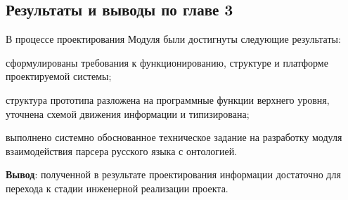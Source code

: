 \subsection{Результаты и выводы по главе 3}

В процессе проектирования Модуля были достигнуты следующие результаты:
\begin{list}{}{\leftmargin=1.5cm}
	\item сформулированы требования к функционированию, структуре и платформе проектируемой системы;
	\item структура прототипа разложена на программные функции верхнего уровня, уточнена схемой движения информации и типизирована;
	\item выполнено системно обоснованное техническое задание на разработку модуля взаимодействия парсера русского языка с онтологией.
\end{list}

\textbf{Вывод}: полученной в результате проектирования информации достаточно для перехода к стадии инженерной реализации проекта.